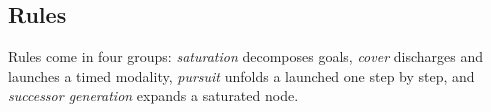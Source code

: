 %
\noindent






\subsection{Rules}\label{ss:rules}
Rules come in four groups: \emph{saturation} decomposes goals, \emph{cover} discharges and
launches a timed modality, \emph{pursuit} unfolds a launched one step by step, and
\emph{successor generation} expands a saturated node.
%
%
\vspace{-0.1cm}
